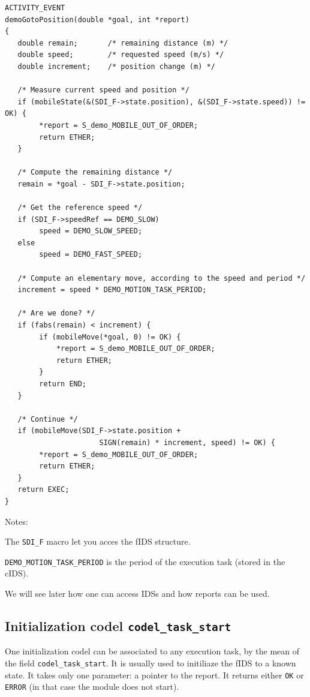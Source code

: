 \begin{center}\begin{cartouche}\small\begin{verbatim}
ACTIVITY_EVENT
demoGotoPosition(double *goal, int *report)
{
   double remain;       /* remaining distance (m) */
   double speed;        /* requested speed (m/s) */
   double increment;    /* position change (m) */

   /* Measure current speed and position */
   if (mobileState(&(SDI_F->state.position), &(SDI_F->state.speed)) != OK) {
        *report = S_demo_MOBILE_OUT_OF_ORDER;
        return ETHER;
   }

   /* Compute the remaining distance */
   remain = *goal - SDI_F->state.position;

   /* Get the reference speed */
   if (SDI_F->speedRef == DEMO_SLOW) 
        speed = DEMO_SLOW_SPEED;
   else
        speed = DEMO_FAST_SPEED;

   /* Compute an elementary move, according to the speed and period */
   increment = speed * DEMO_MOTION_TASK_PERIOD;

   /* Are we done? */
   if (fabs(remain) < increment) {
        if (mobileMove(*goal, 0) != OK) {
            *report = S_demo_MOBILE_OUT_OF_ORDER;
            return ETHER;
        }
        return END;
   }

   /* Continue */
   if (mobileMove(SDI_F->state.position +
                      SIGN(remain) * increment, speed) != OK) {
        *report = S_demo_MOBILE_OUT_OF_ORDER;
        return ETHER;
   }
   return EXEC;
}
\end{verbatim}\end{cartouche}\end{center}

Notes:

The \texttt{SDI\_F} macro let you acces the fIDS structure.

\texttt{DEMO\_MOTION\_TASK\_PERIOD} is the period of the execution task
(stored in the cIDS).

We will see later how one can access IDSs and how reports can be used.


\subsection{Initialization codel \texttt{codel\_task\_start}}

One initialization codel can be associated to any  execution task, by the
mean of the field \texttt{codel\_task\_start}. It is  usually used to initiliaze
the fIDS to a known state. It takes only one  parameter: a pointer to the
report.   It returns either \texttt{OK}  or \texttt{ERROR}  (in  that case the
module does not start).

